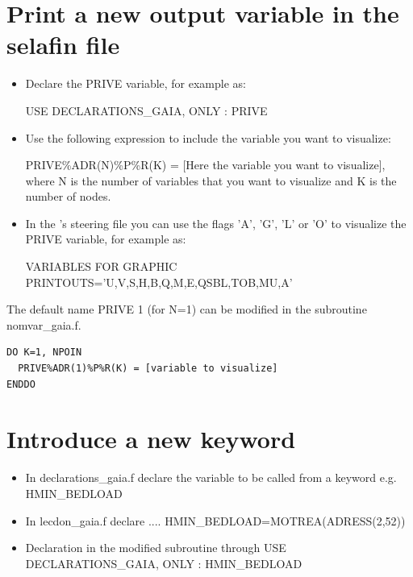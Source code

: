 \section{Print a new output variable in the selafin file}
\begin{itemize}
\item Declare the {\ttfamily PRIVE} variable, for example as:

{\ttfamily USE DECLARATIONS\_GAIA, ONLY : PRIVE}

\item Use the following expression to include the variable you want to visualize:

{\ttfamily PRIVE\%ADR(N)\%P\%R(K) = [Here the variable you want to visualize]}, where {\ttfamily N} is the number of variables that you want to visualize and {\ttfamily K} is the number of nodes.

\item In the \gaia's steering file you can use the flags {\ttfamily'A'}, {\ttfamily'G'}, {\ttfamily'L'} or {\ttfamily'O'} to visualize the {\ttfamily PRIVE} variable, for example as:

{\ttfamily VARIABLES FOR GRAPHIC PRINTOUTS='U,V,S,H,B,Q,M,E,QSBL,TOB,MU,A'}
\end{itemize}

The default name {\ttfamily PRIVE 1} (for {\ttfamily N=1}) can be modified in the subroutine {\ttfamily nomvar\_gaia.f}.

\begin{lstlisting}[frame=trBL]
DO K=1, NPOIN
  PRIVE%ADR(1)%P%R(K) = [variable to visualize]
ENDDO
\end{lstlisting}

\section{Introduce a new keyword}
\begin{itemize}
\item In {\ttfamily declarations\_gaia.f} declare the variable to be called from a keyword e.g. {\ttfamily HMIN\_BEDLOAD}
\item In {\ttfamily lecdon\_gaia.f} declare .... {\ttfamily HMIN\_BEDLOAD=MOTREA(ADRESS(2,52))}
\item Declaration in the modified subroutine through {\ttfamily USE DECLARATIONS\_GAIA, ONLY : HMIN\_BEDLOAD}
\end{itemize}


